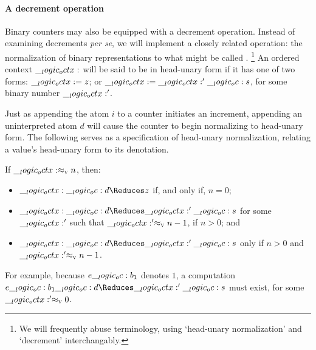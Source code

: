 \paragraph{A decrement operation}
Binary counters
may also be equipped with a decrement operation.
Instead of examining decrements \emph{per se}, we will implement a closely related operation: the normalization of binary representations to what might be called .%
\footnote{We will frequently abuse terminology, using \enquote*{head-unary normalization} and \enquote*{decrement} interchangably.}
An ordered context $\__logic_octx:$ will be said to be in head-unary form if it has one of two forms: $\__logic_octx: = z$; or $\__logic_octx: = \__logic_octx:' \__logic_oc: s$, for some binary number $\__logic_octx:'$.

Just as appending the atom $i$ to a counter initiates an increment, appending an uninterpreted atom $d$ will cause the counter to begin normalizing to head-unary form.
The following  serves as a specification of head-unary normalization, relating a value's head-unary form to its denotation.
%
\begin{theorem}
  If $\__logic_octx: \approx\sb{\text{\normalfont\scshape v}} n$, then:
  \begin{itemize}[nosep]
  \item $\octx \oc d \Reduces z$ if, and only if, $n=0$;
  \item $\octx \oc d \Reduces \octx' \oc s$ for some $\__logic_octx:'$ such that $\__logic_octx:' \approx\sb{\text{\normalfont\scshape v}} n-1$, if $n > 0$; and
  \item $\octx \oc d \Reduces \octx' \oc s$ only if $n > 0$ and $\__logic_octx:' \approx\sb{\text{\normalfont\scshape v}} n-1$.
  \end{itemize}
\end{theorem}
%
\noindent
For example, because $e \__logic_oc: b_1$ denotes $1$, a computation $e \oc b_1 \oc d \Reduces \octx' \oc s$ must exist, for some $\__logic_octx:' \approx\sb{\text{\normalfont\scshape v}} 0$.

